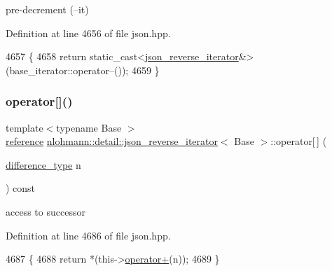 pre-\/decrement (--it) 



Definition at line 4656 of file json.\+hpp.


\begin{DoxyCode}
4657     \{
4658         \textcolor{keywordflow}{return} \textcolor{keyword}{static\_cast<}\hyperlink{classnlohmann_1_1detail_1_1json__reverse__iterator_a0246de16ece16293f2917dfa5d96e278}{json\_reverse\_iterator}&\textcolor{keyword}{>}(base\_iterator::operator--());
4659     \}
\end{DoxyCode}
\mbox{\label{classnlohmann_1_1detail_1_1json__reverse__iterator_a8ed9e445e03c49c46612eb7f7d55bb61}} 
\subsubsection{\texorpdfstring{operator[]()}{operator[]()}}
{\footnotesize\ttfamily template$<$typename Base $>$ \\
\hyperlink{classnlohmann_1_1detail_1_1json__reverse__iterator_a42f51a69bac7b2aebb613b2164e457f1}{reference} \hyperlink{classnlohmann_1_1detail_1_1json__reverse__iterator}{nlohmann\+::detail\+::json\+\_\+reverse\+\_\+iterator}$<$ Base $>$\+::operator\mbox{[}$\,$\mbox{]} (\begin{DoxyParamCaption}\item[{\hyperlink{classnlohmann_1_1detail_1_1json__reverse__iterator_a9ab55987c05ec6427ad36082e351cc45}{difference\+\_\+type}}]{n }\end{DoxyParamCaption}) const\hspace{0.3cm}{\ttfamily [inline]}}



access to successor 



Definition at line 4686 of file json.\+hpp.


\begin{DoxyCode}
4687     \{
4688         \textcolor{keywordflow}{return} *(this->\hyperlink{classnlohmann_1_1detail_1_1json__reverse__iterator_aabf172b436988e2edde22f13f27caaed}{operator+}(n));
4689     \}
\end{DoxyCode}
\mbox{\label{classnlohmann_1_1detail_1_1json__reverse__iterator_ae22803d442d483041d17239615f83b58}} 
